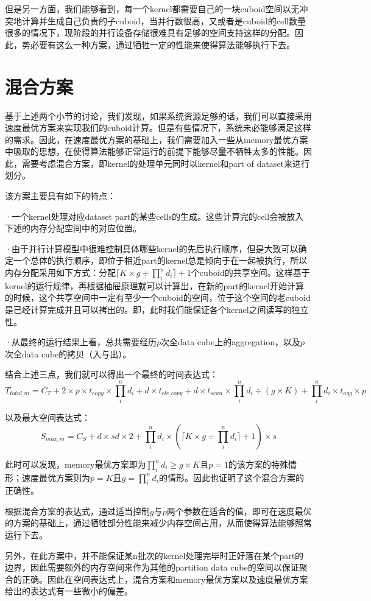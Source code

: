 但是另一方面，我们能够看到，每一个kernel都需要自己的一块cuboid空间以无冲突地计算并生成自己负责的子cuboid，当并行数很高，又或者是cuboid的cell数量很多的情况下，现阶段的并行设备存储很难具有足够的空间支持这样的分配。因此，势必要有这么一种方案，通过牺牲一定的性能来使得算法能够执行下去。

\section{混合方案}

基于上述两个小节的讨论，我们发现，如果系统资源足够的话，我们可以直接采用速度最优方案来实现我们的cuboid计算。但是有些情况下，系统未必能够满足这样的需求。因此，在速度最优方案的基础上，我们需要加入一些从memory最优方案中吸取的思想，在使得算法能够正常运行的前提下能够尽量不牺牲太多的性能。因此，需要考虑混合方案，即kernel的处理单元同时以kernel和part of dataset来进行划分。

该方案主要具有如下的特点：

{\quad}·一个kernel处理对应dataset part的某些cells的生成。这些计算完的cell会被放入下述的内存分配空间中的对应位置。

{\quad}·由于并行计算模型中很难控制具体哪些kernel的先后执行顺序，但是大致可以确定一个总体的执行顺序，即位于相近part的kernel总是倾向于在一起被执行，所以内存分配采用如下方式：分配$\lceil K \times g \div \prod_{i}^{n} d_i \rceil + 1$个cuboid的共享空间。这样基于kernel的运行规律，再根据抽屉原理就可以计算出，在新的part的kernel开始计算的时候，这个共享空间中一定有至少一个cuboid的空间，位于这个空间的老cuboid是已经计算完成并且可以拷出的。即，此时我们能保证各个kernel之间读写的独立性。

{\quad}·从最终的运行结果上看，总共需要经历$p$次全data cube上的aggregation，以及$p$次全data cube的拷贝（入与出）。

结合上述三点，我们就可以得出一个最终的时间表达式：
\begin{equation}
T_{total\_m} = C_T + 2 \times p \times t_{copy} \times \prod_{i}^{n} d_i + d \times t_{ele\_copy} + d \times t_{scan} \times \prod_{i}^{n} d_i \div (g \times K) + \prod_{i}^{n} d_i \times t_{agg} \times p
\end{equation}

以及最大空间表达式：
\begin{equation}
S_{max\_m} = C_S + d \times sd \times 2 + \prod_{i}^{n} d_i \times (\lceil K \times g \div \prod_{i}^{n} d_i \rceil + 1) \times s
\end{equation}

此时可以发现，memory最优方案即为$\prod_{i}^{n} d_i \geq g \times K$且$p = 1$的该方案的特殊情形；速度最优方案则为$p = K$且$g = \prod_{i}^{n} d_i$的情形。因此也证明了这个混合方案的正确性。

根据混合方案的表达式，通过适当控制$g$与$p$两个参数在适合的值，即可在速度最优的方案的基础上，通过牺牲部分性能来减少内存空间占用，从而使得算法能够照常运行下去。

另外，在此方案中，并不能保证某n批次的kernel处理完毕时正好落在某个part的边界，因此需要额外的内存空间来作为其他的partition data cube的空间以保证聚合的正确。因此在空间表达式上，混合方案和memory最优方案以及速度最优方案给出的表达式有一些微小的偏差。
